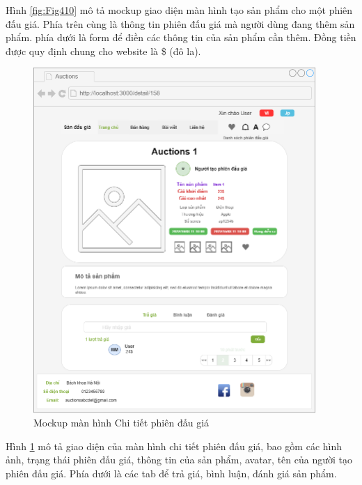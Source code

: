 \documentclass[../DoAn.tex]{subfiles}
\begin{document}
Hình \ref{fig:Fig410} mô tả mockup giao diện màn hình tạo sản phẩm cho một phiên đấu giá. Phía trên cùng là thông tin phiên đấu giá mà người dùng đang thêm sản phẩm. phía dưới là form để điền các thông tin của sản phẩm cần thêm. Đồng tiền được quy định chung cho website là \$ (đô la).
\newpage
\begin{figure}[H]
    \centering
    \includegraphics[width=0.75\linewidth,height=13.1cm]{Hinhve/detailitem.png}
    \caption{Mockup màn hình Chi tiết phiên đấu giá}
    \label{fig:Fig411}
\end{figure}
Hình \ref{fig:Fig411} mô tả giao diện của màn hình chi tiết phiên đấu giá, bao gồm các hình ảnh, trạng thái phiên đấu giá, thông tin của sản phẩm, avatar, tên của người tạo phiên đấu giá. Phía dưới là các tab để trả giá, bình luận, đánh giá sản phẩm. 
\newpage
\end{document}
